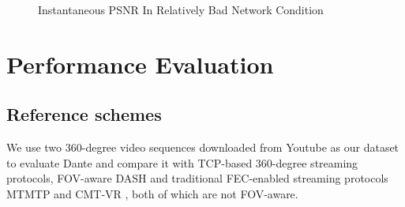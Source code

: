\begin{figure}[!t]
	\centering
    \hspace{-0.3cm}
	\vspace{-0.3cm}
	\caption{Instantaneous PSNR In Relatively Bad Network Condition}
	\vspace{-0.4cm}
	\label{fig:apuct}
\end{figure}	



\section{Performance Evaluation}




\subsection{Reference schemes}
We use two 360-degree video sequences downloaded from Youtube as our dataset to 
evaluate Dante and compare it with TCP-based 360-degree streaming 
protocols, FOV-aware DASH \cite{Omnidirectional_Video_over_HTTP} and traditional FEC-enabled streaming protocols MTMTP \cite{MPMTP} and CMT-VR \cite{CMT-VR}, both of which are not FOV-aware. 


